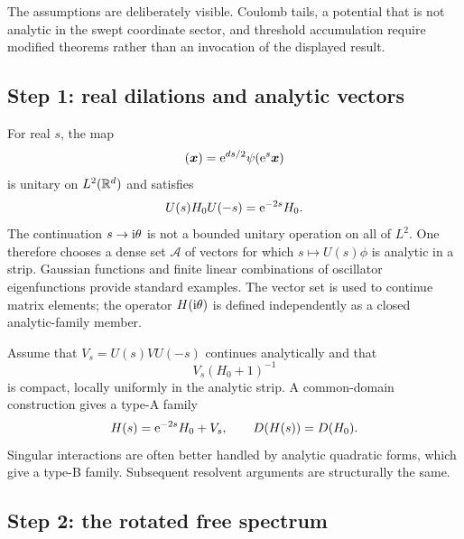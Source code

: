 The assumptions are deliberately visible.  Coulomb tails, a potential that
is not analytic in the swept coordinate sector, and threshold accumulation
require modified theorems rather than an invocation of the displayed result.

\subsection*{Step 1: real dilations and analytic vectors}

For real $s$, the map
\begin{equation}
  [U(s)\psi](\bm x)=\rme^{ds/2}\psi(\rme^s\bm x)
  \label{eq:abc-app-real-dilation}
\end{equation}
is unitary on $L^2(\mathbb{R}^d)$ and satisfies
\begin{equation}
  U(s)H_0U(-s)=\mathrm{e}^{-2s}H_0 .
  \label{eq:abc-app-free-scaling}
\end{equation}
The continuation $s\to\mathrm{i}\theta$ is not a bounded unitary operation on all
of $L^2$.  One therefore chooses a dense set $\mathcal A$ of vectors for
which $s\mapsto U(s)\phi$ is analytic in a strip.  Gaussian functions and
finite linear combinations of oscillator eigenfunctions provide standard
examples.  The vector set is used to continue matrix elements; the operator
$H(\mathrm{i}\theta)$ is defined independently as a closed analytic-family member.

Assume that $V_s=U(s)VU(-s)$ continues analytically and that
\begin{equation}
  V_s(H_0+1)^{-1}
  \label{eq:abc-app-relative-compact}
\end{equation}
is compact, locally uniformly in the analytic strip.  A common-domain
construction gives a type-A family
\begin{equation}
  H(s)=\mathrm{e}^{-2s}H_0+V_s,
  \qquad D(H(s))=D(H_0).
  \label{eq:abc-app-type-A}
\end{equation}
Singular interactions are often better handled by analytic quadratic forms,
which give a type-B family.  Subsequent resolvent arguments are structurally
the same.

\subsection*{Step 2: the rotated free spectrum}

